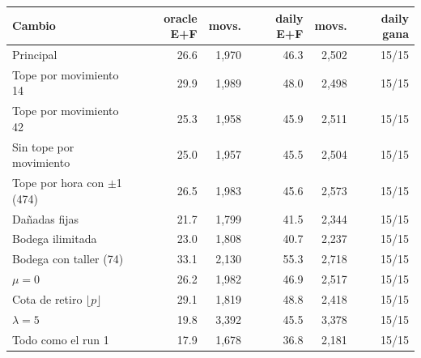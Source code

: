\begin{tabular}{lrrrrr}
\toprule
Cambio & oracle E+F & movs. & daily E+F & movs. & daily gana \\
\midrule
Principal & 26.6 & 1,970 & 46.3 & 2,502 & 15/15 \\
Tope por movimiento 14 & 29.9 & 1,989 & 48.0 & 2,498 & 15/15 \\
Tope por movimiento 42 & 25.3 & 1,958 & 45.9 & 2,511 & 15/15 \\
Sin tope por movimiento & 25.0 & 1,957 & 45.5 & 2,504 & 15/15 \\
Tope por hora con $\pm$1 (474) & 26.5 & 1,983 & 45.6 & 2,573 & 15/15 \\
Dañadas fijas & 21.7 & 1,799 & 41.5 & 2,344 & 15/15 \\
Bodega ilimitada & 23.0 & 1,808 & 40.7 & 2,237 & 15/15 \\
Bodega con taller (74) & 33.1 & 2,130 & 55.3 & 2,718 & 15/15 \\
$\mu = 0$ & 26.2 & 1,982 & 46.9 & 2,517 & 15/15 \\
Cota de retiro $\lfloor p\rfloor$ & 29.1 & 1,819 & 48.8 & 2,418 & 15/15 \\
$\lambda = 5$ & 19.8 & 3,392 & 45.5 & 3,378 & 15/15 \\
Todo como el run 1 & 17.9 & 1,678 & 36.8 & 2,181 & 15/15 \\
\bottomrule
\end{tabular}
